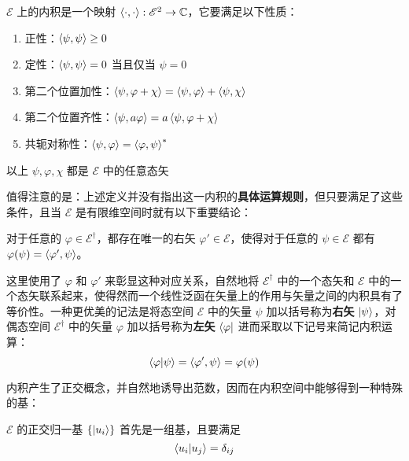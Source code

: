 \documentclass[cn,10pt,math=newtx,citestyle=gb7714-2015,bibstyle=gb7714-2015]{elegantbook}
\def\ms{\mathscr}
\def\C{\mathbb C}
\def\vphi{\varphi}
\def\dg{\dagger}
\begin{document}
\begin{definition}[态空间上的内积]\label{def:innerproduct}
$\ms E$ 上的内积是一个映射 $\Braket{\cdot,\cdot}:\ms E^2\rightarrow\C$，它要满足以下性质：
\begin{enumerate}
    \item 正性：$\Braket{{\psi},{\psi}} \ge 0$
    \item 定性：$\Braket{{\psi},{\psi}} = 0$ 当且仅当 ${\psi}={0}$
    \item 第二个位置加性：$\Braket{{\psi},{\vphi}+{\chi}}=\Braket{{\psi},{\vphi}}+\Braket{{\psi},{\chi}}$
    \item 第二个位置齐性：$\Braket{{\psi},a{\vphi}}=a\Braket{{\psi},{\vphi}+{\chi}}$ 
    \item 共轭对称性：$\Braket{{\psi},{\vphi}}=\Braket{{\vphi},{\psi}}^*$ 
\end{enumerate}
以上 $\psi,\vphi,\chi$ 都是 $\ms E$ 中的任意态矢
\end{definition}

值得注意的是：上述定义并没有指出这一内积的\textbf{具体运算规则}，但只要满足了这些条件，且当 $\ms E$ 是有限维空间时就有以下重要结论：
\begin{theorem}\label{thm:Rietz}
对于任意的 ${\vphi}\in\ms E^\dg$，都存在唯一的右矢 ${\vphi'}\in\ms E$，使得对于任意的 ${\psi}\in\ms E$ 都有 ${\vphi}({\psi})=\Braket{{\vphi'},{\psi}}$。
\end{theorem}

这里使用了 $\vphi$ 和 $\vphi'$ 来彰显这种对应关系，自然地将 $\ms E^\dg$ 中的一个态矢和 $\ms E$ 中的一个态矢联系起来，使得然而一个线性泛函在矢量上的作用与矢量之间的内积具有了等价性。一种更优美的记法是将态空间 $\ms E$ 中的矢量 $\psi$ 加以括号称为\textbf{右矢} $\ket\psi$，对偶态空间 $\ms E^\dg$ 中的矢量 $\vphi$ 加以括号称为\textbf{左矢} $\bra\vphi$ 进而采取以下记号来简记内积运算：
\begin{equation}\label{eq:iptolm}
    \braket{\vphi|\psi}=\Braket{\vphi',\psi}=\vphi(\psi)
\end{equation}

内积产生了正交概念，并自然地诱导出范数，因而在内积空间中能够得到一种特殊的基：

\begin{definition}[正交归一基]\label{def:orthonormalbasis}
$\ms E$ 的正交归一基 $\{\ket{u_i}\}$ 首先是一组基，且要满足
\begin{equation*}
    \braket{u_i|u_j}=\delta_{ij}
\end{equation*}
\end{definition}
\end{document}
